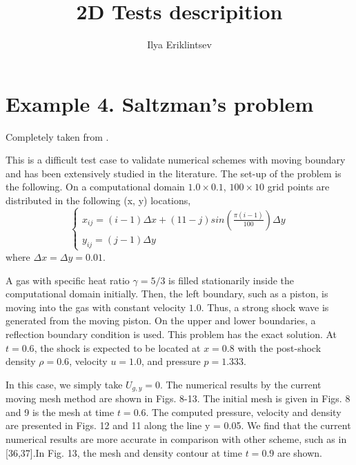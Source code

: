 \documentclass[10pt,a4paper]{article}
\author{Ilya Eriklintsev}
\title{2D Tests descripition}
\begin{document}
\section{Example 4. Saltzman's problem} 
Completely taken from \cite{Ni2013}.

This is a difficult test case to validate numerical schemes with moving boundary and has been extensively studied in the literature. The set-up of the problem is
the following. On a computational domain $ 1.0 \times 0.1$, $100 \times 10$ grid points are distributed in the following (x, y) locations,
\[
 \begin{cases}
   x_{ij} = (i-1) \Delta x + (11 - j) sin(\frac{\pi (i-1)}{100}) \Delta y \\
   y_{ij} = (j-1) \Delta y
  \end{cases}
\]
where $\Delta x = \Delta y = 0.01$.

A gas with specific heat ratio $\gamma = 5/3 $ is filled stationarily inside
the computational domain initially. Then, the left boundary, such as a piston, is moving into the gas with constant velocity $1.0$. Thus, a strong shock wave is generated from the moving piston. On the upper and lower boundaries, a reflection boundary condition is used. This problem has the exact solution. At $t = 0.6$, the shock is expected to be located at $x = 0.8$ with the post-shock density $\rho = 0.6$, velocity $u = 1.0$, and pressure $p = 1.333$. 

In this case, we simply take $U_{g,y} = 0$. The numerical results by the current moving mesh method are shown in Figs. 8-13. The initial mesh is given in Figs. 8 and 9 is the mesh at time $t = 0.6$. The computed pressure, velocity and density are presented in Figs. 12 and 11 along the line y = 0.05. We find that the current numerical results are more accurate in comparison with other scheme, such as in [36,37].In Fig. 13, the mesh and density contour at time $t = 0.9$ are shown.

\medskip
 
\printbibliography
\end{document}
